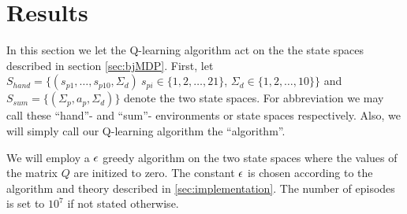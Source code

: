 \section{Results}
In this section we let the Q-learning algorithm act on the the state spaces described in section \ref{sec:bjMDP}. 
First, let $S_{hand}=\{  (s_{p1},\ldots,s_{p10},\Sigma_{d})\ s_{pi} \in \{1,2,\ldots, 21 \}$, 
$\Sigma_{d}\in \{1,2,\ldots, 10 \} \}$ and $S_{sum}=\{  (\Sigma_p, a_p, \Sigma_d )  \}$ denote the two state spaces. 
For abbreviation we may call these ``hand''- and ``sum''- environments or state spaces respectively. 
Also, we will simply call our Q-learning algorithm the ``algorithm''.

We will employ a $\epsilon$ greedy algorithm on the two state spaces where the values of the matrix $Q$ are initized to zero. 
The constant $\epsilon$ is chosen according to the algorithm and theory described in \ref{sec:implementation}. 
The number of episodes is set to $10^7$ if not stated otherwise. 


